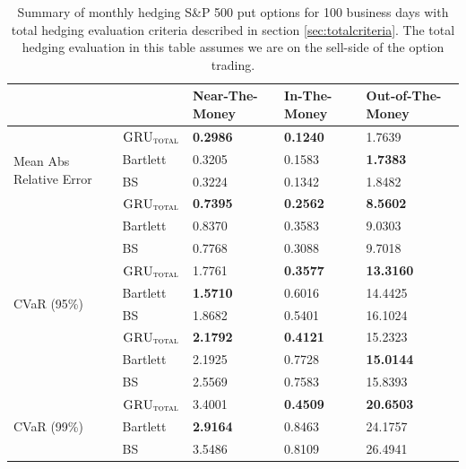 \documentclass[letterpaper,12pt,titlepage,oneside,final]{book}
\numberwithin{equation}{section}
\theoremstyle{definition}
\newcommand{\modelT}{\textsc{GRU}_{\textsc{total}}}
\begin{document}
\begin{table}[htp!]
	\centering
	\begin{tabular}{ll|l|l|l|}
		\cline{3-5}
		&          & Near-The-Money   & In-The-Money     & Out-of-The-Money  \\ \hline
		\multicolumn{1}{|l|}{\multirow{4}{*}{Mean Abs Relative Error}} & $\modelT$    & \textbf{0.2986}  & \textbf{0.1240}  & 1.7639            \\  
		\multicolumn{1}{|l|}{}                                & Bartlett & 0.3205           & 0.1583           & \textbf{1.7383}            \\  
		\multicolumn{1}{|l|}{}                                & BS       & 0.3224           & 0.1342           & 1.8482            \\ \hline
		\multicolumn{1}{|l|}{\multirow{4}{*}{VaR (95\%)}}     & $\modelT$    & \textbf{0.7395} & \textbf{0.2562} & \textbf{8.5602}           \\  
		\multicolumn{1}{|l|}{}                                & Bartlett & 0.8370          & 0.3583          & 9.0303           \\  
		\multicolumn{1}{|l|}{}                                & BS       & 0.7768          & 0.3088          & 9.7018           \\ \hline
		\multicolumn{1}{|l|}{\multirow{4}{*}{CVaR (95\%)}}    & $\modelT$    & 1.7761          & \textbf{0.3577} & \textbf{13.3160} \\  
		\multicolumn{1}{|l|}{}                                & Bartlett & \textbf{1.5710} & 0.6016          & 14.4425          \\  
		\multicolumn{1}{|l|}{}                                & BS       & 1.8682          & 0.5401          & 16.1024          \\ \hline
		\multicolumn{1}{|l|}{\multirow{4}{*}{VaR (99\%)}}     & $\modelT$    & \textbf{2.1792}          & \textbf{0.4121} & 15.2323          \\  
		\multicolumn{1}{|l|}{}                                & Bartlett & 2.1925         & 0.7728          & \textbf{15.0144} \\  
		\multicolumn{1}{|l|}{}                                & BS       & 2.5569          & 0.7583          & 15.8393          \\ \hline
		\multicolumn{1}{|l|}{\multirow{4}{*}{CVaR (99\%)}}    & $\modelT$    & 3.4001          & \textbf{0.4509}  & \textbf{20.6503} \\  
		\multicolumn{1}{|l|}{}                                & Bartlett & \textbf{2.9164} & 0.8463          & 24.1757          \\  
		\multicolumn{1}{|l|}{}                                & BS       & 3.5486          & 0.8109          & 26.4941          \\ \hline
	\end{tabular}
	\caption{Summary of monthly hedging S\&P 500 put options for 100 business days with total hedging evaluation criteria described in section \ref{sec:totalcriteria}. The total hedging evaluation in this table assumes we are on the sell-side of the option trading.}
	\label{table:putTotalM}
\end{table}
\end{document}
